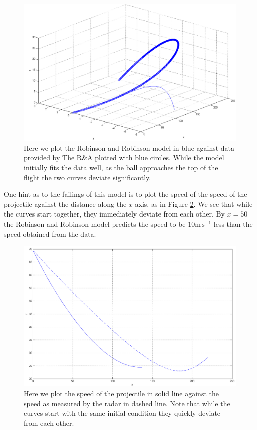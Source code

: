 \begin{figure}
\centering
\includegraphics[scale=0.5]{../images/data1-rr-3d.png}
\caption[Plotting the data against an example Robinson and Robinson trajectory in 3D]{Here we plot the Robinson
and Robinson model in blue against data provided by The R\&A plotted with blue circles. While the model initially fits
the data well, as the ball approaches the top of the flight the two curves deviate significantly.}
\label{data-rr-3d}
\end{figure}
\pagebreak

One hint as to the failings of this model is to plot the speed of the speed of the projectile against
the distance along the $x$-axis, as in Figure \ref{data-rr-v}. We see that while the curves start
together, they immediately deviate from each other. By $x=50$ the Robinson and Robinson model predicts 
the speed to be $10\text{m}\,\text{s}^{-1}$ less than the speed obtained from the data.
\begin{figure}
\centering
\includegraphics[scale=0.56]{../images/data1-rr-v.png}
\caption[Plot of speed in Robinson and Robinson model against the speed in the data]{Here we plot the
speed of the projectile in solid line against the speed as measured by the radar in dashed line. Note that while
the curves start with the same initial condition they quickly deviate from each other.}
\label{data-rr-v}
\end{figure}

